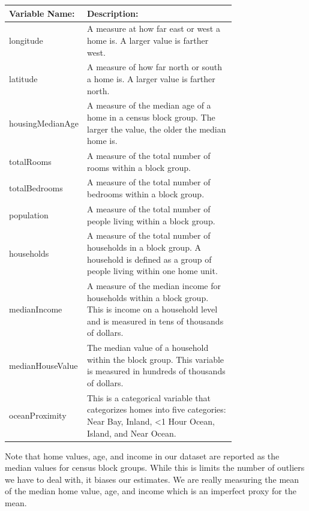 \documentclass{article}
\begin{document}
\begin{table}[h]
\begin{tabular}{|l|p{0.75\linewidth}|}
\hline
\textbf{Variable Name:} & \textbf{Description:}                                            \\ \hline
longitude                               & A measure at how far east or west a home is. A larger value is farther west.    \\ \hline
latitude                                & A measure of how far north or south a home is. A larger value is farther north. \\ \hline
housingMedianAge & A measure of the median age of a home in a census block group. The larger the value, the older the median home is.                                      \\ \hline
totalRooms                              & A measure of the total number of rooms within a block group.                         \\ \hline
totalBedrooms                           & A measure of the total number of bedrooms within a block group.                      \\ \hline
population                              & A measure of the total number of people living within a block group.                 \\ \hline
households       & A measure of the total number of households in a block group. A household is defined as a group of people living within one home unit.        \\ \hline
medianIncome     & A measure of the median income for households within a block group. This is income on a household level and is measured in tens of thousands of dollars.     \\ \hline
medianHouseValue & The median value of a household within the block group. This variable is measured in hundreds of thousands of dollars.                                                        \\ \hline
oceanProximity   & This is a categorical variable that categorizes homes into five categories: Near Bay, Inland, \textless 1 Hour Ocean, Island, and Near Ocean. \\ \hline
\end{tabular}
\end{table}

\noindent  Note that home values, age, and income in our dataset are reported as the median values for census block groups. While this is limits the number of outliers we have to deal with, it biases our estimates. We are really measuring the mean of the median home value, age, and income which is an imperfect proxy for the mean. 
\end{document}
